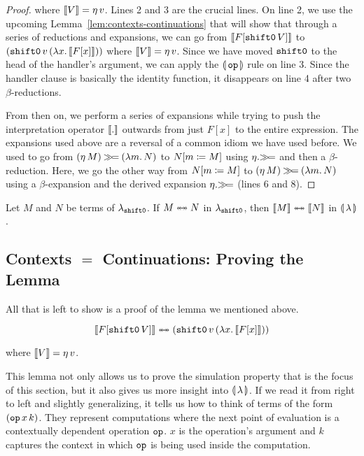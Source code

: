 \begin{proof}
where $\llbracket V \rrbracket = \eta\,v$. Lines 2 and 3 are the crucial lines. On
line 2, we use the upcoming Lemma~\ref{lem:contexts-continuations} that
will show that through a series of reductions and expansions, we can go
from $\llbracket F[\mathtt{shift0}\,V] \rrbracket$ to
$(\mathtt{shift0}\,v\,(\lambda x.\, \llbracket F[x] \rrbracket))$ where $\llbracket V \rrbracket =
\eta\,v$. Since we have moved $\mathtt{shift0}$ to the head of the
handler's argument, we can apply the $\llparenthesis \, \mathtt{op} \, \rrparenthesis$ rule on line
3. Since the handler clause is basically the identity function, it
disappears on line 4 after two $\beta$-reductions.

From then on, we perform a series of expansions while trying to push the
interpretation operator $\llbracket . \rrbracket$ outwards from just $F[x]$ to the entire
expression. The expansions used above are a reversal of a common idiom we
have used before. We used to go from $(\eta\,M) \mathbin{\gg\!=} (\lambda m.\, N)$
to $N[m \coloneqq M]$ using $\eta.\mathbin{\gg\!=}$ and then a
$\beta$-reduction. Here, we go the other way from $N[m \coloneqq M]$ to
$(\eta\,M) \mathbin{\gg\!=} (\lambda m.\, N)$ using a $\beta$-expansion and the
derived expansion $\eta.\mathbin{\gg\!=}$ (lines 6 and 8).
\end{proof}

\begin{corollary}
  \label{coro:simul-sem}
  Let $M$ and $N$ be terms of $\lambda_{\mathtt{shift0}}$. If $M \twoheadleftarrow \mathrel{\mkern-15mu} \twoheadrightarrow N$ in
  $\lambda_{\mathtt{shift0}}$, then $\llbracket M \rrbracket \twoheadleftarrow \mathrel{\mkern-15mu} \twoheadrightarrow \llbracket N \rrbracket$ in
  $\llparenthesis \, \lambda \, \rrparenthesis$.
\end{corollary}


\subsection*{Contexts $=$ Continuations: Proving the Lemma}

All that is left to show is a proof of the lemma we mentioned above.

\begin{lemma}
\label{lem:contexts-continuations}
$$
\llbracket F[\mathtt{shift0}\,V] \rrbracket \twoheadleftarrow \mathrel{\mkern-15mu} \twoheadrightarrow (\mathtt{shift0}\,v\,(\lambda x.\, \llbracket F[x] \rrbracket))
$$

where $\llbracket V \rrbracket = \eta\,v$. 
\end{lemma}

This lemma not only allows us to prove the simulation property that is the
focus of this section, but it also gives us more insight into
$\llparenthesis \, \lambda \, \rrparenthesis$. If we read it from right to left and slightly
generalizing, it tells us how to think of terms of the form
$(\mathtt{op}\,x\,k)$. They represent computations where the next point
of evaluation is a contextually dependent operation $\mathtt{op}$. $x$ is the
operation's argument and $k$ captures the context in which $\mathtt{op}$ is
being used inside the computation.

